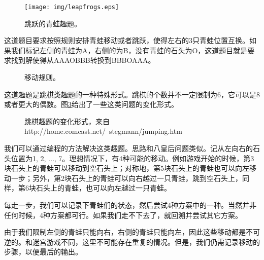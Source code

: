 \documentclass[UTF8]{article}
\begin{document}
\begin{figure}[htbp]
 \centering
 \texttt{[image: img/leapfrogs.eps]}
 \caption{跳跃的青蛙趣题。}
 \label{fig:leapfrog}
\end{figure}

这道题目要求按照规则安排青蛙移动或者跳跃，使得左右的3只青蛙位置互换。如果我们标记左侧的青蛙为A，右侧的为B，没有青蛙的石头为O，这道题目就是要求找到解使得从AAAOBBB转换到BBBOAAA。

\begin{figure}[htbp]
 \centering
  \hspace{0.02\textwidth}
  \hspace{0.02\textwidth}
 \caption{移动规则。}
 \label{fig:pegrules}
\end{figure}

这道趣题是跳棋类趣题的一种特殊形式。跳棋的个数并不一定限制为6，它可以是8或者更大的偶数。图\ref{fig:pegpuzzles}给出了一些这类问题的变化形式。

\begin{figure}[htbp]
 \centering
  \hspace{0.02\textwidth}
  \hspace{0.02\textwidth}
 \caption{跳棋趣题的变化形式，来自http://home.comcast.net/~stegmann/jumping.htm}
 \label{fig:pegpuzzles}
\end{figure}

我们可以通过编程的方法解决这类趣题。思路和八皇后问题类似。记从左向右的石头位置为1, 2, ..., 7。理想情况下，有4种可能的移动。例如游戏开始的时候，第3块石头上的青蛙可以移动到空石头上；对称地，第5块石头上的青蛙也可以向左移动一步；另外，第2块石头上的青蛙可以向右越过一只青蛙，跳到空石头上，同样，第6块石头上的青蛙，也可以向左越过一只青蛙。

每走一步，我们可以记录下青蛙们的状态，然后尝试4种方案中的一种。当然并非任何时候，4种方案都可行。如果我们走不下去了，就回溯并尝试其它方案。

由于我们限制左侧的青蛙只能向右，右侧的青蛙只能向左，因此这些移动都是不可逆的。和迷宫游戏不同，这里不可能存在重复的情况。但是，我们仍需记录移动的步骤，以便最后的输出。
\end{document}
